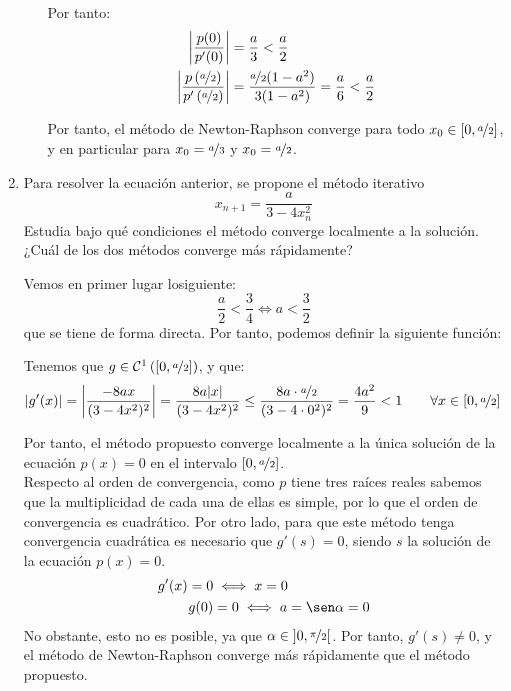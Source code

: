 \begin{ejercicio}
\begin{enumerate}
\begin{enumerate}
            Por tanto:
            \begin{align*}
                \left|\dfrac{p(0)}{p'(0)}\right| &= \dfrac{a}{3}<\frac{a}{2}\\
                \left|\dfrac{p\left(\nicefrac{a}{2}\right)}{p'\left(\nicefrac{a}{2}\right)}\right| &= \dfrac{\nicefrac{a}{2}(1-a^2)}{3(1-a^2)} = \dfrac{a}{6}<\frac{a}{2}
            \end{align*}

            Por tanto, el método de Newton-Raphson converge para todo $x_0\in \left[0,\nicefrac{a}{2}\right]$, y en particular para $x_0 = \nicefrac{a}{3}$ y $x_0 = \nicefrac{a}{2}$.


        \end{enumerate}
        \item Para resolver la ecuación anterior, se propone el método iterativo
        \[
            x_{n+1} = \frac{a}{3- 4x_n^2}
        \]
        Estudia bajo qué condiciones el método converge localmente a la solución. ¿Cuál de los dos métodos converge más rápidamente?

        Vemos en primer lugar losiguiente:
        \begin{equation*}
            \frac{a}{2}<\frac{3}{4}\iff a<\frac{3}{2}
        \end{equation*}
        que se tiene de forma directa. Por tanto, podemos definir la siguiente función:

        Tenemos que $g\in \mathcal{C}^1\left(\left[0,\nicefrac{a}{2}\right]\right)$, y que:
        \begin{align*}
            |g'(x)| &= \left|\dfrac{-8ax}{(3-4x^2)^2}\right|
            = \dfrac{8a|x|}{(3-4x^2)^2}\leq \dfrac{8a\cdot \nicefrac{a}{2}}{(3-4\cdot 0^2)^2} = \dfrac{4a^2}{9}<1\qquad \forall x\in \left[0,\nicefrac{a}{2}\right]
        \end{align*}

        Por tanto, el método propuesto converge localmente a la única solución de la ecuación $p(x) = 0$ en el intervalo $\left[0,\nicefrac{a}{2}\right]$.\\

        Respecto al orden de convergencia, como $p$ tiene tres raíces reales sabemos que la multiplicidad de cada una de ellas es simple, por lo que el orden de convergencia es cuadrático. Por otro lado, para que este método tenga convergencia cuadrática es necesario que $g'(s)=0$, siendo $s$ la solución de la ecuación $p(x)=0$.
        \begin{align*}
            g'(x)=0&\iff x=0\\
            g(0)&= 0\iff a=\sen\alpha=0
        \end{align*}
        No obstante, esto no es posible, ya que $\alpha\in \left]0,\nicefrac{\pi}{2}\right[$. Por tanto, $g'(s)\neq 0$, y el método de Newton-Raphson converge más rápidamente que el método propuesto.


\end{enumerate}
\end{ejercicio}
